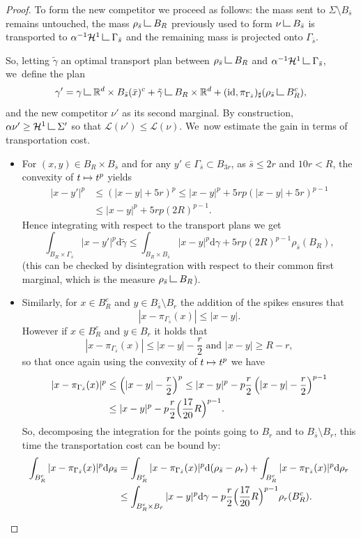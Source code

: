 \documentclass[10pt]{amsart}
\newcommand\mto{\mathchoice{\longmapsto}{\mapsto}{\mapsto}{\mapsto}}
\theoremstyle{definition}
\newcommand\LM[1]{\hbox{\vrule width.5pt \vbox to#1pt{\vfill \hrule width#1pt height.5pt}}}
\newcommand\LL{{\mathchoice {\>\LM7\>}{\>\LM7\>}{\,\LM5\,}{\,\LM{3.35}\,}}}
\newcommand{\mres}{\LL}
\newcommand\cH{\mathcal{H}}
\newcommand{\RR}{\mathbb{R}}
\newcommand\dd{\mathrm{d}}
\begin{document}
\begin{proof}
To form the new competitor we proceed as follows: the mass sent to $\Sigma\setminus B_{\bar s}$ remains untouched, the mass $\rho_{\bar s}\mres B_R$ previously used to form $\nu\mres B_{\bar s}$ is transported to $\alpha^{-1}\cH^1\mres \Gamma_{\bar s}$ and the remaining mass is projected onto $\Gamma_{\bar s}$.

So, letting $\tilde \gamma$ an optimal transport plan between $\rho_{\bar s}\mres B_R$ and $\alpha^{-1}\cH^1\mres \Gamma_{\bar s}$, we~define the plan
\[
\gamma' =
\gamma\mres \RR^d\times B_{\bar s}(\bar x)^c
+
\tilde \gamma\mres B_R\times\RR^d
+
(\text{id}, \pi_{\Gamma_{\bar s}})_\sharp(\rho_{\bar s}\mres B_R^c),
\]
and the new competitor $\nu'$ as its second marginal. By construction, $\alpha\nu' \ge \cH^1\mres \Sigma'$ so that $\mathcal{L}(\nu') \le \mathcal{L}(\nu)$. We~now estimate the gain in terms of transportation cost.
\begin{itemize}
\item For $(x,y)\in B_R\times B_{\bar s}$ and for any $y' \in \Gamma_{\bar s}\subset B_{3r}$, as $\bar s\le 2r$ and $10r < R$, the convexity of $t \mto t^p$ yields
\begin{align*}
|x - y'|^p
&\le
\left(|x - y| + 5r\right)^p
\le
|x - y|^p
+
5rp
\left(|x - y|+5r\right)^{p-1} \\
&\le
|x - y|^p
+
5rp {{\left(2R\right)^{p-1}}}.
\end{align*}
Hence integrating with respect to the transport plans we get
\[
\int_{B_R\times\Gamma_{\bar s}}|x - y'|^p \dd \tilde \gamma
\le
\int_{B_R\times B_{\bar s}}|x - y|^p \dd \gamma
+
5rp
\left({2R}\right)^{p-1}\rho_{\bar s}(B_R),
\]
(this can be checked by disintegration with respect to their common first marginal, which is the measure $\rho_{\bar s}\mres B_R$).
\item
Similarly, for $x \in B_R^c$ and $y \in B_{\bar s}\setminus B_r$ the addition of the spikes ensures that
\[
|x - \pi_{\Gamma_{\bar s}}(x)| \le |x - y|.
\]
However if $x \in B_R^c$ and $y \in B_r$ it holds that
\[
|x - \pi_{\Gamma_{\bar s}}(x)| \le |x - y| - \frac{r}{2}
\text{ and }
|x - y| \ge R - r,
\]
so that once again using the convexity of $t\mto t^p$ we have
\begin{align*}
|x - \pi_{\Gamma_{\bar s}}(x)|^p
&\le
\left(|x - y| -\frac{r}{2}\right)^p
\le
|x - y|^p
-
p\frac{r}{2}
\left(|x - y|-\frac{r}{2}\right)^{p-1}\\
&\le
|x - y|^p
-
p\frac{r}{2}
\Bigl(\frac{17}{20}R\Bigr)^{p-1}.
\end{align*}
So, decomposing the integration for the points going to $B_r$ and to $B_{\bar s}\setminus B_r$, this time the transportation cost can be bound by:
\begin{align*}
\int_{B_R^c}
|x - \pi_{\Gamma_{\bar s}}(x)|^p \dd \rho_{\bar s}
&=
\int_{B_R^c}
|x - \pi_{\Gamma_{\bar s}}(x)|^p \dd (\rho_{\bar s} -\rho_{r})
+
\int_{B_R^c}
|x - \pi_{\Gamma_{\bar s}}(x)|^p \dd \rho_{r}\\
&\le
\int_{B_R^c\times B_{\bar r}}|x - y|^p \dd \gamma
-
p\frac{r}{2}
\Bigl(\frac{17}{20}R\Bigr)^{p-1}\rho_r(B_R^c).
\end{align*}
\end{itemize}


\end{proof}
\end{document}
